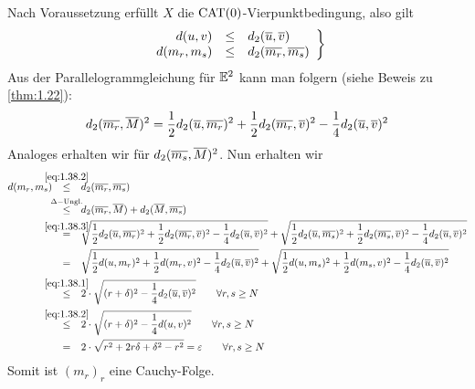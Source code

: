 \begin{beweis}
\begin{description}
\begin{figure}[h]
	\end{figure}
	Nach Voraussetzung erfüllt $X$ die $\operatorname{CAT(0)}$-Vierpunktbedingung, also gilt
	\begin{equation}
		\left. \begin{array}{rcl}
			d(u,v) & \leq & d_2(\overline{u},\overline{v}) \\
			d(m_r,m_s) & \leq & d_2(\overline{m_r},\overline{m_s})
		\end{array} \right\} \label{eq:1.38.2}
	\end{equation}
	Aus der Parallelogrammgleichung für $\mathbb{E}^2$ kann man folgern (siehe Beweis zu \autoref{thm:1.22}):
	\begin{equation}
		d_2(\overline{m_r},\overline{M})^2 = \frac{1}{2} d_2 (\overline{u}, \overline{m_r})^2 + \frac{1}{2} d_2 (\overline{m_r},\overline{v})^2 - \frac{1}{4} d_2(\overline{u},\overline{v})^2 \label{eq:1.38.3}
	\end{equation}
	Analoges erhalten wir für $d_2(\overline{m_s},\overline{M})^2$.
	Nun erhalten wir
	\begin{align*}
		d(m_r,m_s) &\stack{\eqref{eq:1.38.2}}{\leq} d_2(\ol{m_r},\ol{m_s}) \\
		&\stack{\Delta-\text{Ungl.}}{\leq} d_2(\ol{m_r},\ol{M}) + d_2(\ol{M},\ol{m_s}) \\
		&\stack{\eqref{eq:1.38.3}}{=} \sqrt{\frac{1}{2} d_2(\ol{u},\ol{m_r})^2 + \frac{1}{2} d_2(\ol{m_r},\ol{v})^2 - \frac{1}{4} d_2(\ol{u},\ol{v})^2}
		+ \sqrt{\frac{1}{2} d_2(\ol{u},\ol{m_s})^2 + \frac{1}{2} d_2(\ol{m_s},\ol{v})^2 - \frac{1}{4} d_2(\ol{u},\ol{v})^2} \\
		&\stack{}{=} \sqrt{\frac{1}{2} d(u,m_r)^2 + \frac{1}{2} d(m_r,v)^2 - \frac{1}{4} d_2(\ol{u},\ol{v})^2}
		+ \sqrt{\frac{1}{2} d(u,m_s)^2 + \frac{1}{2} d(m_s,v)^2 - \frac{1}{4} d_2(\ol{u},\ol{v})^2} \\
		&\stack{\eqref{eq:1.38.1}}{\leq} 2 \cdot \sqrt{(r+\delta)^2 - \frac{1}{4} d_2(\ol{u},\ol{v})^2} \qquad \forall r,s \geq N \\
		&\stack{\eqref{eq:1.38.2}}{\leq} 2 \cdot \sqrt{(r+\delta)^2 - \frac{1}{4} d(u,v)^2} \qquad \forall r,s \geq N \\
		&\stack{}{=} 2 \cdot \sqrt{r^2 + 2r \delta + \delta^2 - r^2} = \varepsilon \qquad \forall r,s \geq N
	\end{align*}
	Somit ist $(m_r)_r$ eine Cauchy-Folge.
	

\end{description}
\end{beweis}
